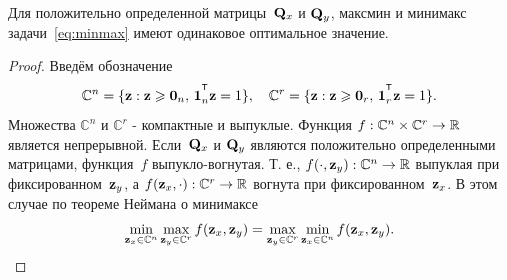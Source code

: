 \begin{theorem}
	Для положительно определенной матрицы~$\mathbf{Q}_x$ и $\mathbf{Q}_y$, максмин и минимакс задачи~\eqref{eq:minmax} имеют одинаковое оптимальное значение.
\end{theorem}
\begin{proof}
	Введём обозначение
	\begin{equation*}
	\mathbb{C}^n = \{\bz : \bz \geq \bZero_n, \, \bOne_n^{\T}\bz=1\}, \quad \mathbb{C}^r = \{\bz : \bz \geq \bZero_r, \, \bOne_r^{\T}\bz=1\}.
	\end{equation*}
	Множества $\mathbb{C}^n$ и $\mathbb{C}^r$ - компактные и выпуклые. Функция $f: \mathbb{C}^n \times \mathbb{C}^r \rightarrow \mathbb{R}$ является непрерывной. Если~$\mathbf{Q}_x$ и $\mathbf{Q}_y$ являются положительно определенными матрицами, функция~$f$ выпукло-вогнутая. Т. е.,
	$f(\cdot, \mathbf{z}_y): \mathbb{C}^n \rightarrow \mathbb{R}$ выпуклая при фиксированном~$\mathbf{z}_y$, а $f(\mathbf{z}_x, \cdot): \mathbb{C}^r \rightarrow \mathbb{R}$ вогнута при фиксированном~$\mathbf{z}_x$.
	В этом случае по теореме Неймана о минимаксе
	\begin{equation*}
	\min_{\mathbf{z}_x \in \mathbb{C}^n} \max_{\mathbf{z}_y \in \mathbb{C}^r} f(\mathbf{z}_x, \mathbf{z}_y) = \max_{\mathbf{z}_y \in \mathbb{C}^r} \min_{\mathbf{z}_x\in \mathbb{C}^n} f(\mathbf{z}_x, \mathbf{z}_y).
	\end{equation*}
\end{proof}

